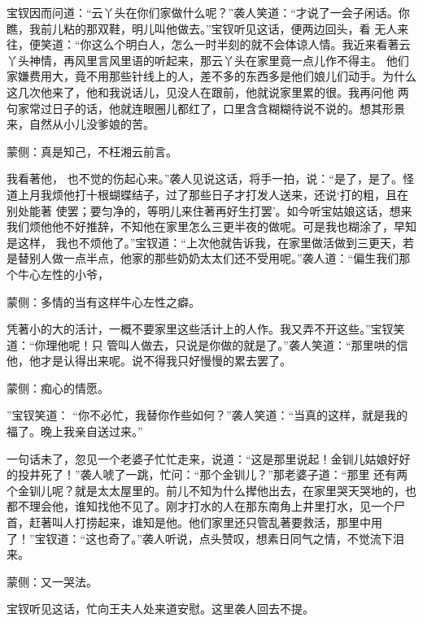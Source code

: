 \begin{parag}
    宝钗因而问道：“云丫头在你们家做什么呢？”袭人笑道：“才说了一会子闲话。你瞧，我前儿粘的那双鞋，明儿叫他做去。”宝钗听见这话，便两边回头，看 无人来往，便笑道：“你这么个明白人，怎么一时半刻的就不会体谅人情。我近来看著云丫头神情，再风里言风里语的听起来，那云丫头在家里竟一点儿作不得主。 他们家嫌费用大，竟不用那些针线上的人，差不多的东西多是他们娘儿们动手。为什么这几次他来了，他和我说话儿，见没人在跟前，他就说家里累的很。我再问他 两句家常过日子的话，他就连眼圈儿都红了，口里含含糊糊待说不说的。想其形景来，自然从小儿没爹娘的苦。\begin{note}蒙侧：真是知己，不枉湘云前言。\end{note}我看著他， 也不觉的伤起心来。”袭人见说这话，将手一拍，说：“是了，是了。怪道上月我烦他打十根蝴蝶结子，过了那些日子才打发人送来，还说‘打的粗，且在别处能著 使罢；要匀净的，等明儿来住著再好生打罢’。如今听宝姑娘这话，想来我们烦他他不好推辞，不知他在家里怎么三更半夜的做呢。可是我也糊涂了，早知是这样， 我也不烦他了。”宝钗道：“上次他就告诉我，在家里做活做到三更天，若是替别人做一点半点，他家的那些奶奶太太们还不受用呢。”袭人道：“偏生我们那个牛心左性的小爷，\begin{note}蒙侧：多情的当有这样牛心左性之癖。\end{note}凭著小的大的活计，一概不要家里这些活计上的人作。我又弄不开这些。”宝钗笑道：“你理他呢！只 管叫人做去，只说是你做的就是了。”袭人笑道：“那里哄的信他，他才是认得出来呢。说不得我只好慢慢的累去罢了。\begin{note}蒙侧：痴心的情愿。\end{note}”宝钗笑道： “你不必忙，我替你作些如何？”袭人笑道：“当真的这样，就是我的福了。晚上我亲自送过来。”
\end{parag}


\begin{parag}
    一句话未了，忽见一个老婆子忙忙走来，说道：“这是那里说起！金钏儿姑娘好好的投井死了！”袭人唬了一跳，忙问：“那个金钏儿？”那老婆子道：“那里 还有两个金钏儿呢？就是太太屋里的。前儿不知为什么撵他出去，在家里哭天哭地的，也都不理会他，谁知找他不见了。刚才打水的人在那东南角上井里打水，见一个尸首，赶著叫人打捞起来，谁知是他。他们家里还只管乱著要救活，那里中用了！”宝钗道：“这也奇了。”袭人听说，点头赞叹，想素日同气之情，不觉流下泪 来。\begin{note}蒙侧：又一哭法。\end{note}宝钗听见这话，忙向王夫人处来道安慰。这里袭人回去不提。
\end{parag}


